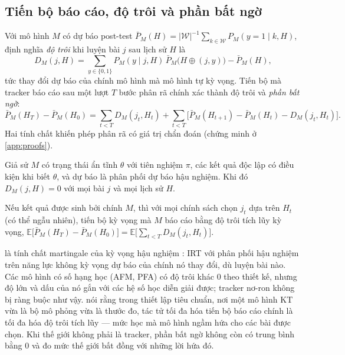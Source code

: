 \subsection{Tiến bộ báo cáo, độ trôi và phần bất ngờ}\label{sec:drift}

Với mô hình $M$ có dự báo post-test $\bar P_M(H)=|\mathcal W|^{-1}\sum_{k\in\mathcal W}P_M(y=1\mid k,H)$, định nghĩa \emph{độ trôi} khi luyện bài $j$ sau lịch sử $H$ là
\begin{equation}
D_M(j,H) = \sum_{y\in\{0,1\}} P_M(y\mid j,H)\,\bar P_M\bigl(H\oplus(j,y)\bigr) - \bar P_M(H),
\label{eq:drift}
\end{equation}
tức thay đổi dự báo của chính mô hình mà mô hình tự kỳ vọng. Tiến bộ mà tracker báo cáo sau một lượt $T$ bước phân rã chính xác thành độ trôi và \emph{phần bất ngờ}:
\begin{equation}
\bar P_M(H_{T}) - \bar P_M(H_0) = \sum_{t<T} D_M(j_t,H_t) + \sum_{t<T} \bigl[\bar P_M(H_{t+1}) - \bar P_M(H_t) - D_M(j_t,H_t)\bigr].
\label{eq:decomposition}
\end{equation}
Hai tính chất khiến phép phân rã có giá trị chẩn đoán (chứng minh ở \ref{app:proofs}).

\begin{proposition}\label{prop:nodrift}
Giả sử $M$ có trạng thái ẩn tĩnh $\theta$ với tiên nghiệm $\pi$, các kết quả độc lập có điều kiện khi biết $\theta$, và dự báo là phân phối dự báo hậu nghiệm. Khi đó $D_M(j,H)=0$ với mọi bài $j$ và mọi lịch sử $H$.
\end{proposition}

\begin{proposition}\label{prop:insim}
Nếu kết quả được sinh bởi chính $M$, thì với mọi chính sách chọn $j_t$ dựa trên $H_t$ (có thể ngẫu nhiên), tiến bộ kỳ vọng mà $M$ báo cáo bằng độ trôi tích lũy kỳ vọng, $\mathbb E\bigl[\bar P_M(H_T)-\bar P_M(H_0)\bigr] = \mathbb E\bigl[\sum_{t<T} D_M(j_t,H_t)\bigr]$.
\end{proposition}

 là tính chất martingale của kỳ vọng hậu nghiệm \citep{williams1991probability}: IRT với phân phối hậu nghiệm trên năng lực không kỳ vọng dự báo của chính nó thay đổi, dù luyện bài nào. Các mô hình có số hạng học (AFM, PFA) có độ trôi khác 0 theo thiết kế, nhưng độ lớn và dấu của nó gắn với các hệ số học diễn giải được; tracker nơ-ron không bị ràng buộc như vậy.  nói rằng trong thiết lập tiêu chuẩn, nơi một mô hình KT vừa là bộ mô phỏng vừa là thước đo, tác tử tối đa hóa tiến bộ báo cáo chính là tối đa hóa độ trôi tích lũy — mức học mà mô hình ngầm hứa cho các bài được chọn. Khi thế giới không phải là tracker, phần bất ngờ không còn có trung bình bằng 0 và đo mức thế giới bất đồng với những lời hứa đó.

